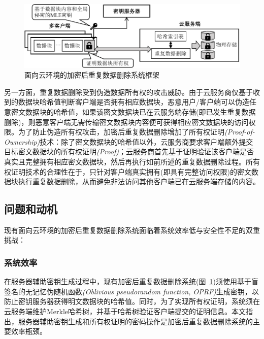 \begin{figure}[!htb]
  \small
  \centering
  \includegraphics[width=\textwidth]{pic/background/Cloud-encrypted-deduplication-logic.pdf}
  \caption{面向云环境的加密后重复数据删除系统框架}
  \label{fig:Cloud-based-encrypted-deduplication-storage-logic}
\end{figure}

另一方面，重复数据删除受到伪造数据所有权的攻击威胁。由于云服务商仅基于收到的数据块哈希值判断客户端是否拥有相应数据块，恶意用户/客户端可以伪造任意密文数据块的哈希值，如果该密文数据块已在云服务端存储(即已发生重复数据删除)，则恶意客户端无需传输密文数据块内容便可获得相应密文数据块的访问权限。为了防止伪造所有权攻击，加密后重复数据删除增加了所有权证明\textit{(Proof-of-Ownership)}技术：除了密文数据块的哈希值以外，云服务商要求客户端额外提交目标密文数据块的所有权证明\textit{(Proof)}；云服务商首先基于证明验证该客户端是否真实且完整拥有相应密文数据块，然后再执行如前所述的重复数据删除过程。所有权证明技术的合理性在于，只针对客户端真实拥有(即具有完整访问权限)的密文数据块执行重复数据删除，从而避免非法访问其他客户端已在云服务端存储的内容。

\subsection{问题和动机}
\label{subsec:intro-problem}

现有面向云环境的加密后重复数据删除系统面临着系统效率低与安全性不足的双重挑战：

\subsubsection{系统效率}
\label{subsubsec:intro-problem-performance}

在服务器辅助密钥生成过程中，现有加密后重复数据删除系统(图~\ref{fig:Cloud-based-encrypted-deduplication-storage-logic})须使用基于盲签名的无记忆伪随机函数\textit{(Oblivious pseudorandom function, OPRF)}生成密钥，以防止密钥服务器获得明文数据块的哈希值。同时，为了实现所有权证明，系统须在云服务端维护Merkle哈希树，并基于哈希树验证客户端提交的证明信息。本文指出，服务器辅助密钥生成和所有权证明的密码操作是加密后重复数据删除系统的主要效率瓶颈。

